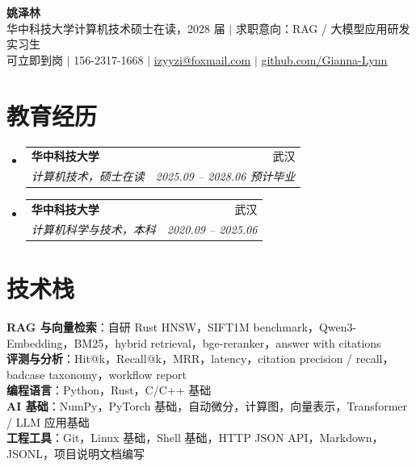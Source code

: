 \documentclass[letterpaper,11pt]{article}
\makeatletter
\newcommand{\resumeSubheading}[4]{
  \vspace{-2pt}\item
    \begin{tabular*}{0.97\textwidth}[t]{l@{\extracolsep{\fill}}r}
      \textbf{#1} & #2 \\
      \textit{\small#3} & \textit{\small #4} \\
    \end{tabular*}\vspace{-7pt}
}
\newcommand{\resumeSubHeadingListStart}{\begin{itemize}[leftmargin=0.15in, label={}]}
\newcommand{\resumeSubHeadingListEnd}{\end{itemize}}
\makeatother
\begin{document}
\begin{center}
    \textbf{\Huge 姚泽林} \\ \vspace{8pt}
    \small 华中科技大学计算机技术硕士在读，2028 届 $|$ 求职意向：RAG / 大模型应用研发实习生 \\ \vspace{1pt}
    \small 可立即到岗 $|$
    156-2317-1668 $|$
    \href{mailto:izyyzi@foxmail.com}{\underline{izyyzi@foxmail.com}} $|$
    \href{https://github.com/Gianna-Lynn}{\underline{github.com/Gianna-Lynn}}
\end{center}


\section{教育经历}
  \resumeSubHeadingListStart
    \resumeSubheading
      {华中科技大学}{武汉}
      {计算机技术，硕士在读}{2025.09 -- 2028.06 预计毕业}
    \resumeSubheading
      {华中科技大学}{武汉}
      {计算机科学与技术，本科}{2020.09 -- 2025.06}
  \resumeSubHeadingListEnd


\section{技术栈}
 \begin{itemize}[leftmargin=0.15in, label={}]
    \small{\item{
     \textbf{RAG 与向量检索}{：自研 Rust HNSW，SIFT1M benchmark，Qwen3-Embedding，BM25，hybrid retrieval，bge-reranker，answer with citations} \\[2pt]
     \textbf{评测与分析}{：Hit@k，Recall@k，MRR，latency，citation precision / recall，badcase taxonomy，workflow report} \\[2pt]
     \textbf{编程语言}{：Python，Rust，C/C++ 基础} \\[2pt]
     \textbf{AI 基础}{：NumPy，PyTorch 基础，自动微分，计算图，向量表示，Transformer / LLM 应用基础} \\[2pt]
     \textbf{工程工具}{：Git，Linux 基础，Shell 基础，HTTP JSON API，Markdown，JSONL，项目说明文档编写}
    }}
 \end{itemize}


\end{document}
